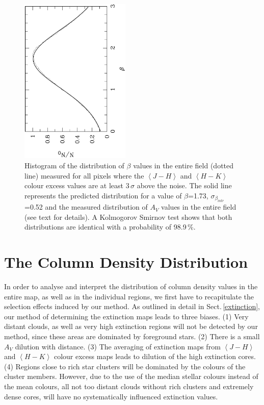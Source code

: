 \documentclass[useAMS,usenatbib]{mn2e}
\begin{document}
\begin{figure}
\includegraphics[height=8cm,angle=-90]{histo_entire.ps}
\caption{\label{beta_dist} Histogram of the distribution of $\beta$ values in
the entire field (dotted line) measured for all pixels where the $\left< J-H
\right>$ and $\left< H-K \right>$ colour excess values are at least 3\,$\sigma$
above the noise. The solid line represents the predicted distribution for a
value of $\beta$=1.73, $\sigma_{\beta_{intr}}$=0.52 and the measured
distribution of $A_V$ values in the entire field (see text for details). A
Kolmogorov Smirnov test shows that both distributions are identical with a
probability of 98.9\,\%.}
\end{figure}

\section{The Column Density Distribution}
\label{clumps}
 
In order to analyse and interpret the distribution of column density values in
the entire map, as well as in the individual regions, we first have to
recapitulate the selection effects induced by our method. As outlined in detail
in Sect.\,\ref{extinction}, our method of determining the extinction maps leads
to three biases. (1) Very distant clouds, as well as very high extinction
regions will not be detected by our method, since these areas are dominated by
foreground stars. (2) There is a small $A_V$ dilution with distance. (3)
The averaging of extinction maps from $\left< J-H \right>$ and $\left< H-K
\right>$ colour excess maps leads to dilution of the high extinction cores. (4)
Regions close to rich star clusters will be dominated by the colours of the
cluster members. However, due to the use of the median stellar colours instead
of the mean colours, all not too distant clouds without rich clusters and
extremely dense cores, will have no systematically influenced extinction values.
\end{document}
